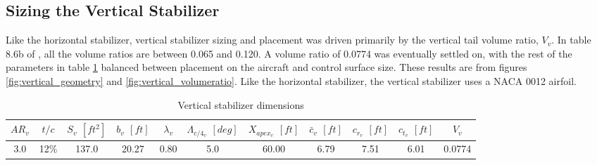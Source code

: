 \documentclass[conf]{new-aiaa}
\begin{document}
\subsection{Sizing the Vertical Stabilizer}

Like the horizontal stabilizer, vertical stabilizer sizing and placement was driven primarily by the vertical tail volume ratio, $V_v$. In table 8.6b of \cite{orange_book}, all the volume ratios are between 0.065 and 0.120. A volume ratio of 0.0774 was eventually settled on, with the rest of the parameters in table \ref{tab:vertical_stabilizer_size} balanced between placement on the aircraft and control surface size. These results are from figures \ref{fig:vertical_geometry} and \ref{fig:vertical_volumeratio}. Like the horizontal stabilizer, the vertical stabilizer uses a NACA 0012 airfoil.

\begin{table}[H]
\centering
\caption{Vertical stabilizer dimensions}
\begin{tabular}{|c|c|c|c|c|c|c|c|c|c|c|}\hline
    $AR_v$ & $t/c$ & $S_v$ $[ft^2]$ & $b_v$ $[ft]$ & $\lambda_v$ & $\Lambda_{c/4_v}$ $[deg]$ & $X_{apex_v}$ $[ft]$ & $\bar{c}_v$ $[ft]$ & $c_{r_v}$ $[ft]$ & $c_{t_v}$ $[ft]$ & $V_v$ \\ \hline
    3.0 & 12\% & 137.0 & 20.27 & 0.80 & 5.0  & 60.00 & 6.79 & 7.51 & 6.01 & 0.0774 \\ \hline
\end{tabular}
\label{tab:vertical_stabilizer_size}
\end{table}
\end{document}
